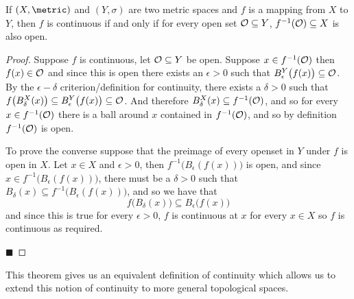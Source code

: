 \documentclass[10pt]{article}
\def\openset{{\cal O}}
\begin{document}


\bigskip

\begin{thrm*}

    If $(X,\metric)$ and $(Y,\sigma)$ are two metric spaces and $f$ is a mapping from $X$ to $Y$, then $f$ is continuous if and only if for every open set $\openset\subseteq Y$, $f^{-1}(\openset)\subseteq X$
    is also open.

\end{thrm*}

\begin{proof}

    Suppose $f$ is continuous, let $\openset\subseteq Y$ be open.
    Suppose $x\in f^{-1}(\openset)$ then $f(x)\in\openset$ and since this is open there exists an $\epsilon>0$ such that $B_\epsilon^Y\bigl(f(x)\bigr)\subseteq\openset$.
    By the $\epsilon-\delta$ criterion/definition for continuity, there exists a $\delta>0$ such that $f\bigl(B_\delta^X(x)\bigr)\subseteq B_\epsilon^Y\bigl(f(x)\bigr)\subseteq\openset$.
    And therefore $B_\delta^X(x)\subseteq f^{-1}(\openset)$, and so for every $x\in f^{-1}(\openset)$ there is a ball around $x$ contained in $f^{-1}(\openset)$, and so by definition $f^{-1}(\openset)$ is
    open.

    To prove the converse suppose that the preimage of every openset in $Y$ under $f$ is open in $X$.
    Let $x\in X$ and $\epsilon>0$, then $f^{-1}\bigl(B_\epsilon(f(x))\bigr)$ is open, and since $x\in f^{-1}\bigl(B_\epsilon(f(x))\bigr)$, there must be a $\delta>0$ such that
    $B_\delta(x)\subseteq f^{-1}\bigl(B_\epsilon(f(x))\bigr)$, and so we have that
    \[ f\bigl(B_\delta(x)\bigr) \subseteq B_\epsilon\bigl(f(x)\bigr) \]
    and since this is true for every $\epsilon>0$, $f$ is continuous at $x$ for every $x\in X$ so $f$ is continuous as required.

    \hfill$\blacksquare$

\end{proof}

This theorem gives us an equivalent definition of continuity which allows us to extend this notion of continuity to more general topological spaces.
\end{document}
